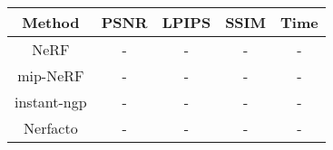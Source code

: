 \begin{table}[h]
\centering
\begin{tabular}{ccccc}
\hline
Method      & PSNR & LPIPS & SSIM & Time \\ \hline
NeRF        & -    & -     & -    & -    \\
mip-NeRF    & -    & -     & -    & -    \\
instant-ngp & -    & -     & -    & -    \\
Nerfacto    & -    & -     & -    & -    \\ \hline
\end{tabular}
\label{tab:method-comparison}
\end{table}